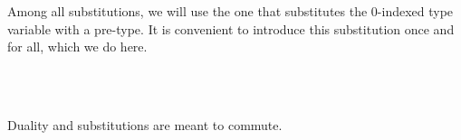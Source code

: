 Among all substitutions, we will use the one that substitutes the 0-indexed type
variable with a pre-type. It is convenient to introduce this substitution once
and for all, which we do here.

\begin{code}%
\>[0]\AgdaOperator{\AgdaFunction{[\AgdaUnderscore{}/]}}\AgdaSpace{}%
\AgdaSymbol{:}\AgdaSpace{}%
\AgdaSymbol{\}}\AgdaSpace{}%
\AgdaSpace{}%
\AgdaSpace{}%
\AgdaSpace{}%
\AgdaSpace{}%
\AgdaSpace{}%
\AgdaSymbol{(}\AgdaSpace{}%
\AgdaSymbol{)}\AgdaSpace{}%
\AgdaSpace{}%
\AgdaSpace{}%
\<%
\\
\>[0]\AgdaOperator{\AgdaFunction{[}}\AgdaSpace{}%
\AgdaSpace{}%
\AgdaOperator{\AgdaFunction{/]}}\AgdaSpace{}%
%
\>[16]\AgdaSymbol{=}\AgdaSpace{}%
\<%
\\
\>[0]\AgdaOperator{\AgdaFunction{[}}\AgdaSpace{}%
\AgdaSpace{}%
\AgdaOperator{\AgdaFunction{/]}}\AgdaSpace{}%
\AgdaSymbol{(}\AgdaSpace{}%
\AgdaSymbol{)}%
\>[16]\AgdaSymbol{=}\AgdaSpace{}%
\AgdaSpace{}%
\<%
\end{code}

Duality and substitutions are meant to commute.

